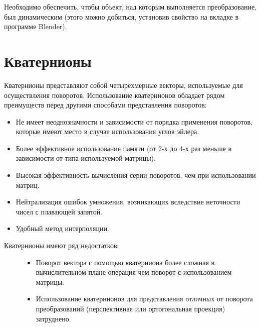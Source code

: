 \documentclass[a4paper,12pt,oneside]{sphinxmanual}
\begin{document}
Необходимо обеспечить, чтобы объект, над которым выполняется преобразование, был
динамическим (этого можно добиться, установив свойство  на вкладке  в программе Blender).


\section{Кватернионы}
\label{developers:index-5}\label{developers:id17}
Кватернионы представляют собой четырёхмерные векторы, используемые для осуществления поворотов. Использование кватернионов обладает рядом преимуществ перед другими способами представления поворотов:
\begin{itemize}
\item {} 
Не имеет неоднозначности и зависимости от порядка применения поворотов, которые имеют место в случае использования углов эйлера.

\item {} 
Более эффективное использование памяти (от 2-х до 4-х раз меньше в зависимости от типа используемой матрицы).

\item {} 
Высокая эффективность вычисления серии поворотов, чем при использовании матриц.

\item {} 
Нейтрализация ошибок умножения, возникающих вследствие неточности чисел с плавающей запятой.

\item {} 
Удобный метод интерполяции.

\end{itemize}
\begin{description}
\item[{Кватернионы имеют ряд недостатков:}] \leavevmode\begin{itemize}
\item {} 
Поворот вектора с помощью кватерниона более сложная в вычислительном плане операция чем поворот с использованием матрицы.

\item {} 
Использование кватернионов для представления отличных от поворота преобразований (перспективная или ортогональная проекция) затруднено.

\end{itemize}

\end{description}
\end{document}
